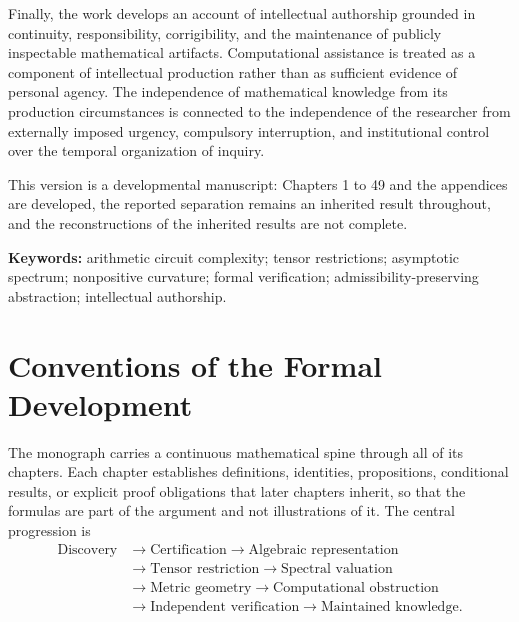 \documentclass[11pt,letterpaper]{report}
\theoremstyle{plain}
\theoremstyle{definition}
\theoremstyle{remark}
\begin{document}
Finally, the work develops an account of intellectual authorship grounded in continuity, responsibility, corrigibility, and the maintenance of publicly inspectable mathematical artifacts. Computational assistance is treated as a component of intellectual production rather than as sufficient evidence of personal agency. The independence of mathematical knowledge from its production circumstances is connected to the independence of the researcher from externally imposed urgency, compulsory interruption, and institutional control over the temporal organization of inquiry.

This version is a developmental manuscript: Chapters 1 to 49 and the appendices are developed, the reported separation remains an inherited result throughout, and the reconstructions of the inherited results are not complete.

\vspace{0.8em}
\noindent\textbf{Keywords:} arithmetic circuit complexity; tensor restrictions; asymptotic spectrum; nonpositive curvature; formal verification; admissibility-preserving abstraction; intellectual authorship.
\endgroup

\clearpage
\tableofcontents
\clearpage
\chapter*{Conventions of the Formal Development}

The monograph carries a continuous mathematical spine through all of its chapters. Each chapter establishes definitions, identities, propositions, conditional results, or explicit proof obligations that later chapters inherit, so that the formulas are part of the argument and not illustrations of it. The central progression is
\[
\begin{aligned}
\text{Discovery}
&\longrightarrow\text{Certification}
\longrightarrow\text{Algebraic representation}\\
&\longrightarrow\text{Tensor restriction}
\longrightarrow\text{Spectral valuation}\\
&\longrightarrow\text{Metric geometry}
\longrightarrow\text{Computational obstruction}\\
&\longrightarrow\text{Independent verification}
\longrightarrow\text{Maintained knowledge}.
\end{aligned}
\]
\end{document}
